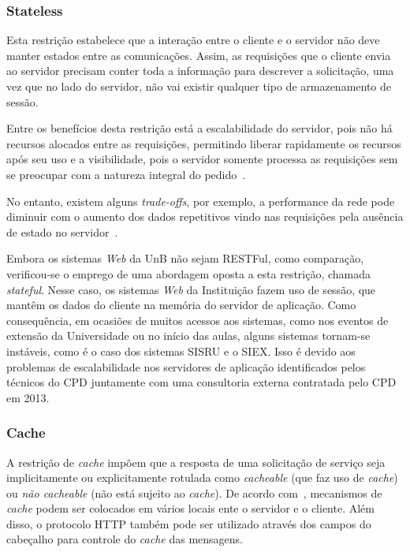 \subsubsection{Stateless} 

Esta restrição estabelece que a interação entre 
o cliente e o servidor não deve manter estados entre as comunicações. 
Assim, as requisições que o cliente envia ao servidor precisam conter 
toda a informação para descrever a solicitação, uma vez que no lado do servidor, 
não vai existir qualquer tipo de armazenamento de sessão. 

Entre os benefícios desta restrição está a escalabilidade 
do servidor, pois não há recursos alocados entre as requisições, permitindo 
liberar rapidamente os recursos após seu uso e a visibilidade, pois o servidor 
somente processa as requisições sem se preocupar com a natureza integral
do pedido~\cite{ModelDriApproRest:2014, krafzig2004service}. 

No entanto, existem alguns \textit{trade-offs}, por exemplo, a performance da 
rede pode diminuir com o aumento dos dados repetitivos vindo nas requisições pela ausência 
de estado no servidor~\cite{fielding2000architectural}. 

Embora os sistemas \textit{Web} da \acrshort{UnB} não sejam RESTFul, como comparação, verificou-se 
o emprego de uma abordagem oposta a esta restrição, chamada \textit{stateful}. Nesse caso, 
os sistemas \textit{Web} da Instituição fazem uso de sessão, que mantêm os dados do cliente na memória do 
servidor de aplicação. Como consequência, em ocasiões de muitos acessos aos sistemas, 
como nos eventos de extensão da Universidade ou no início das aulas, alguns sistemas tornam-se 
instáveis, como é o caso dos sistemas \acrfull{SISRU} e o \acrfull{SIEX}. Isso é devido aos problemas de 
escalabilidade nos servidores de aplicação identificados pelos técnicos do \acrshort{CPD} juntamente com uma 
consultoria externa contratada pelo \acrshort{CPD} em 2013.


\subsubsection{Cache} 

A restrição de \textit{cache} impõem que a resposta de uma solicitação de serviço seja 
implicitamente ou explicitamente rotulada como \textit{cacheable} (que faz uso de \textit{cache}) ou \textit{não cacheable} 
(não está sujeito ao \textit{cache}). De acordo com~\cite{ModelDriApproRest:2014}, mecanismos de \textit{cache} podem ser colocados em vários locais 
ente o servidor e o cliente. Além disso, o protocolo \acrshort{HTTP} também pode ser utilizado através dos campos do cabeçalho 
para controle do \textit{cache} das mensagens. 

